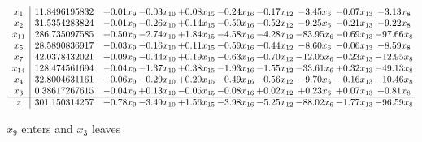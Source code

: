 \documentclass[9pt]{article}
\begin{document}
 \[\begin{array}{c| c c@{\hskip 2pt} c@{\hskip 2pt} c@{\hskip 2pt} c@{\hskip 2pt} c@{\hskip 2pt} c@{\hskip 2pt} c@{\hskip 2pt} c@{\hskip 2pt} }
 x_{1}   &  11.8496195832 & +  0.01 x_{9} & -0.03 x_{10} & +  0.08 x_{15} & -0.24 x_{16} & -0.17 x_{12} & -3.45 x_{6} & -0.07 x_{13} & -3.13 x_{8}\\
 x_{2}   &  31.5354283824 & -0.01 x_{9} & -0.26 x_{10} & +  0.14 x_{15} & -0.50 x_{16} & -0.52 x_{12} & -9.25 x_{6} & -0.21 x_{13} & -9.22 x_{8}\\
 x_{11}   &  286.735097585 & +  0.50 x_{9} & -2.74 x_{10} & +  1.84 x_{15} & -4.58 x_{16} & -4.28 x_{12} & -83.95 x_{6} & -0.69 x_{13} & -97.66 x_{8}\\
 x_{5}   &  28.5890836917 & -0.03 x_{9} & -0.16 x_{10} & +  0.11 x_{15} & -0.59 x_{16} & -0.44 x_{12} & -8.60 x_{6} & -0.06 x_{13} & -8.59 x_{8}\\
 x_{7}   &  42.0378432021 & +  0.09 x_{9} & -0.44 x_{10} & +  0.19 x_{15} & -0.63 x_{16} & -0.70 x_{12} & -12.05 x_{6} & -0.23 x_{13} & -12.95 x_{8}\\
 x_{14}   &  128.474561694 & -0.04 x_{9} & -1.37 x_{10} & +  0.38 x_{15} & -1.93 x_{16} & -1.55 x_{12} & -33.61 x_{6} & +  0.32 x_{13} & -49.13 x_{8}\\
 x_{4}   &  32.8004631161 & +  0.06 x_{9} & -0.29 x_{10} & +  0.20 x_{15} & -0.49 x_{16} & -0.56 x_{12} & -9.70 x_{6} & -0.16 x_{13} & -10.46 x_{8}\\
 x_{3}   &  0.38617267615 & -0.04 x_{9} & +  0.13 x_{10} & -0.05 x_{15} & -0.08 x_{16} & +  0.02 x_{12} & +  0.23 x_{6} & +  0.07 x_{13} & +  0.81 x_{8}\\
\hline
z    &  301.150314257 & +  0.78 x_{9} & -3.49 x_{10} & +  1.56 x_{15} & -3.98 x_{16} & -5.25 x_{12} & -88.02 x_{6} & -1.77 x_{13} & -96.59 x_{8}\\
\end{array}\]


 $ x_{9} $ enters and $ x_{3} $ leaves 
\end{document}
